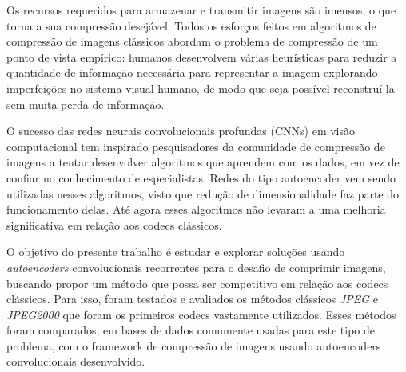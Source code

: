 Os recursos requeridos para armazenar e transmitir imagens são imensos, o que torna a sua compressão desejável. Todos os esforços feitos em algoritmos de compressão de imagens clássicos abordam o problema de compressão de um ponto de vista empírico: humanos desenvolvem várias heurísticas para reduzir a quantidade de informação necessária para representar a imagem explorando imperfeições no sistema visual humano, de modo que seja possível reconstruí-la sem muita perda de informação. 

O sucesso das redes neurais convolucionais profundas (CNNs) em visão computacional tem inspirado pesquisadores da comunidade de compressão de imagens a tentar desenvolver algoritmos que aprendem com os dados, em vez de confiar no conhecimento de especialistas. Redes do tipo autoencoder vem sendo utilizadas nesses algoritmos, visto que redução de dimensionalidade faz parte do funcionamento delas. Até agora esses algoritmos não levaram a uma melhoria significativa em relação aos codecs clássicos.

O objetivo do presente trabalho é estudar e explorar soluções usando \textit{autoencoders} convolucionais recorrentes para o desafio de comprimir imagens, buscando propor um método que possa ser competitivo em relação aos codecs clássicos. Para isso, foram testados e avaliados os métodos clássicos \textit{JPEG} e \textit{JPEG2000} que foram os primeiros codecs vastamente utilizados. Esses métodos foram comparados, em bases de dados comumente usadas para este tipo de problema, com o framework de compressão de imagens usando autoencoders convolucionais desenvolvido.